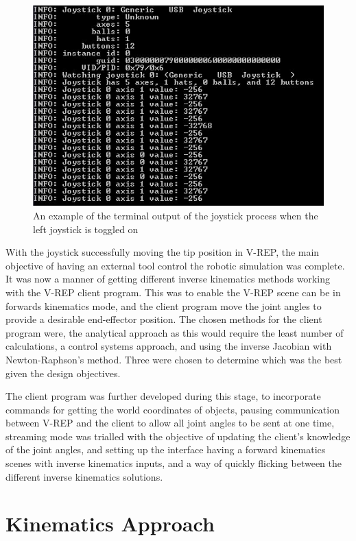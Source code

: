 \documentclass[12pt,openany,a4paper]{book}
\begin{document}
\begin{center}
\begin{figure}[htb]
  \includegraphics[width=0.9\linewidth]{joystick_cmdline.jpg}
\caption{An example of the terminal output of the joystick process when the left joystick is toggled on}
\end{figure}
\end{center}

With the joystick successfully moving the tip position in V-REP, the main objective of having an external tool control the robotic simulation was complete. It was now a manner of getting different inverse kinematics methods working with the V-REP client program. This was to enable the V-REP scene can be in forwards kinematics mode, and the client program move the joint angles to provide a desirable end-effector position. The chosen methods for the client program were, the analytical approach as this would require the least number of calculations, a control systems approach, and using the inverse Jacobian with Newton-Raphson's method. Three were chosen to determine which was the best given the design objectives.

The client program was further developed during this stage, to incorporate commands for getting the world coordinates of objects, pausing communication between V-REP and the client to allow all joint angles to be sent at one time, streaming mode was trialled with the objective of updating the client's knowledge of the joint angles, and setting up the interface having a forward kinematics scenes with inverse kinematics inputs, and a way of quickly flicking between the different inverse kinematics solutions.

\chapter{Kinematics Approach}
\end{document}
